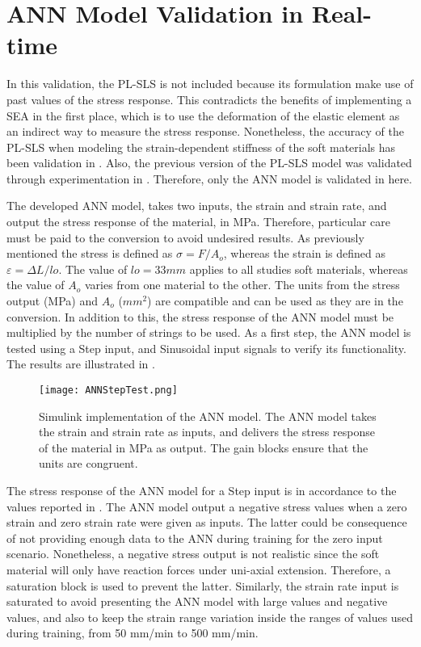 \section{ANN Model Validation in Real-time}

In this validation, the PL-SLS is not included because its formulation make use of past values of the stress response. This contradicts the benefits of implementing a SEA in the first place, which is to use the deformation of the elastic element as an indirect way to measure the stress response. Nonetheless, the accuracy of the PL-SLS when modeling the strain-dependent stiffness of the soft materials has been validation in . Also, the previous version of the PL-SLS model was validated through experimentation in \cite{austin2015control}. Therefore, only the ANN model is validated in here. 

The developed ANN model, takes two inputs, the strain and strain rate, and output the stress response of the material, in MPa. Therefore, particular care must be paid to the conversion to avoid undesired results. As previously mentioned the stress is defined as $\sigma = F/A_o$, whereas the strain is defined as $\varepsilon = \Delta L / lo$. The value of $lo=33mm$ applies to all studies soft materials, whereas the value of $A_o$ varies from one material to the other. The units from the stress output (MPa) and $A_o$ ($mm^2$) are compatible and can be used as they are in the conversion. In addition to this, the stress response of the ANN model must be multiplied by the number of strings to be used. As a first step, the ANN model is tested using a Step input, and Sinusoidal input signals to verify its functionality. The results are illustrated in .

\begin{figure}[hbtp!]
    \centering
    \texttt{[image: ANNStepTest.png]}
    \caption{ Simulink implementation of the ANN model. The ANN model takes the strain and strain rate as inputs, and delivers the stress response of the material in MPa as output. The gain blocks ensure that the units are congruent. }
    \label{fig:ANNStepTest}
\end{figure}

The stress response of the ANN model for a Step input is in accordance to the values reported in . The ANN model output a negative stress values when a zero strain and zero strain rate were given as inputs. The latter could be consequence of not providing enough data to the ANN during training for the zero input scenario. Nonetheless, a negative stress output is not realistic since the soft material will only have reaction forces under uni-axial extension. Therefore, a saturation block is used to prevent the latter. Similarly, the strain rate input is saturated to avoid presenting the ANN model with large values and negative values, and also to keep the strain range variation inside the ranges of values used during training, from 50 mm/min to 500 mm/min.

